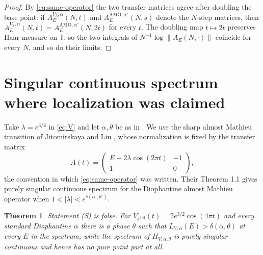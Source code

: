 \documentclass[11pt,reqno]{amsart}
\theoremstyle{plain}
\newtheorem{theorem}{Theorem}[section]
\theoremstyle{definition}
\theoremstyle{remark}
\numberwithin{equation}{section}
\begin{document}
\begin{proof}
  By \eqref{eq:same-operator} the two transfer matrices agree after doubling
  the base point: if $A^{V_\lambda,\alpha}_E(N,t)$ and
  $A^{\mathrm{AMO},\alpha'}_E(N,s)$ denote the $N$-step matrices, then
  $A^{V_\lambda,\alpha}_E(N,t)=A^{\mathrm{AMO},\alpha'}_E(N,2t)$ for every
  $t$. The doubling map $t\mapsto2t$ preserves Haar measure on $\mathbb T$,
  so the two integrals of $N^{-1}\log\lVert A_E(N,\cdot)\rVert$ coincide for
  every $N$, and so do their limits.
\end{proof}

\section{Singular continuous spectrum where localization was claimed}
\label{sec:sc}

Take $\lambda=e^{3/2}$ in \eqref{eq:V} and let $\alpha,\theta$ be as in
. We use the sharp almost Mathieu transition of
Jitomirskaya and Liu \cite{Jitomirskaya_2024ur}, whose normalization is
fixed by the transfer matrix
\begin{equation}
  \label{eq:amo-normalization}
  A(t)=
  \begin{pmatrix}
    E-2\lambda\cos(2\pi t) & -1\\
    1 & 0
  \end{pmatrix},
\end{equation}
the convention in which \eqref{eq:same-operator} was written. Their Theorem
1.1 gives purely singular continuous spectrum for the Diophantine almost
Mathieu operator when $1<|\lambda|<e^{\delta(\alpha',\theta')}$.

\begin{theorem}
  \label{thm:main}
  Statement (S) is false. For $V_{e^{3/2}}(t)=2e^{3/2}\cos(4\pi t)$ and
  every standard Diophantine $\alpha$ there is a phase $\theta$ such that
  $L_{V,\alpha}(E)>\delta(\alpha,\theta)$ at every $E$ in the spectrum,
  while the spectrum of $H_{V,\alpha,\theta}$ is purely singular continuous
  and hence has no pure point part at all.
\end{theorem}
\end{document}

